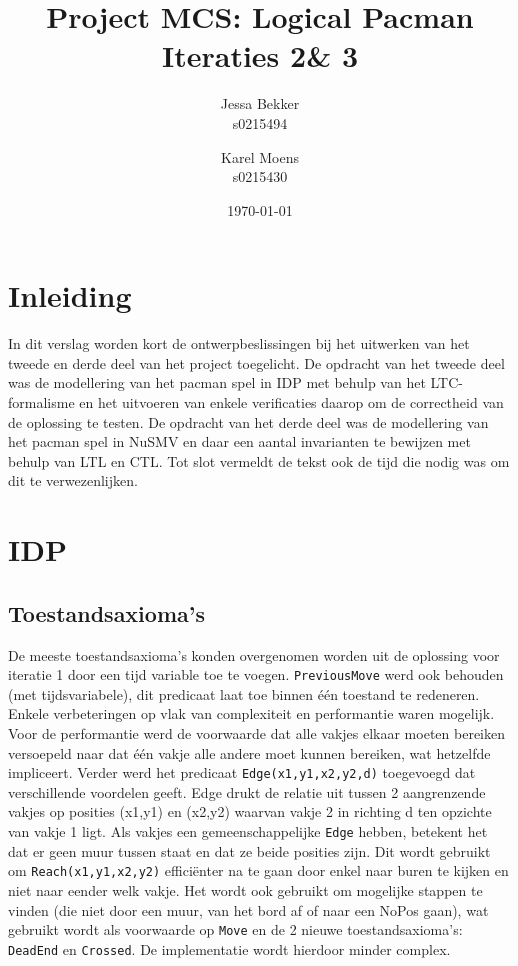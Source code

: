 \documentclass[a4paper,12pt]{article}
\title{Project MCS: Logical Pacman \\ Iteraties 2\& 3}
\author{Jessa Bekker\\s0215494 \and Karel Moens \\ s0215430 }
\date{\today}
\begin{document}
\maketitle


\section{Inleiding}
In dit verslag worden kort de ontwerpbeslissingen bij het uitwerken van het tweede en derde deel van het project toegelicht.
De opdracht van het tweede deel was de modellering van het pacman spel  in IDP met behulp van het LTC-formalisme en het uitvoeren van enkele verificaties daarop om de correctheid van de oplossing te testen.
De opdracht van het derde deel was de modellering van het pacman spel in NuSMV en daar een aantal invarianten te bewijzen met behulp van LTL en CTL.
Tot slot vermeldt de tekst ook de tijd die nodig was om dit te verwezenlijken.

\section{IDP}
\subsection{Toestandsaxioma's}
De meeste toestandsaxioma's konden overgenomen worden uit de oplossing voor iteratie 1 door een tijd variable toe te voegen. \texttt{PreviousMove} werd ook behouden (met tijdsvariabele), dit predicaat laat toe binnen \'e\'en toestand te redeneren. Enkele verbeteringen op vlak van complexiteit en performantie waren mogelijk. Voor de performantie werd de voorwaarde dat alle vakjes elkaar moeten bereiken versoepeld naar dat \'e\'en vakje alle andere moet kunnen bereiken, wat hetzelfde impliceert. Verder werd het predicaat \texttt{Edge(x1,y1,x2,y2,d)} toegevoegd dat verschillende voordelen geeft. Edge drukt de relatie uit tussen 2 aangrenzende vakjes op posities (x1,y1) en (x2,y2) waarvan vakje 2 in richting d ten opzichte van vakje 1 ligt. Als vakjes een gemeenschappelijke \texttt{Edge} hebben, betekent het dat er geen muur tussen staat en dat ze beide posities zijn. Dit wordt gebruikt om \texttt{Reach(x1,y1,x2,y2)} effici\"enter na te gaan door enkel naar buren te kijken en niet naar eender welk vakje. Het wordt ook gebruikt om mogelijke stappen te vinden (die niet door een muur, van het bord af of naar een NoPos gaan), wat gebruikt wordt als voorwaarde op \texttt{Move} en de 2 nieuwe toestandsaxioma's: \texttt{DeadEnd} en \texttt{Crossed}. De implementatie wordt hierdoor minder complex.
\end{document}
